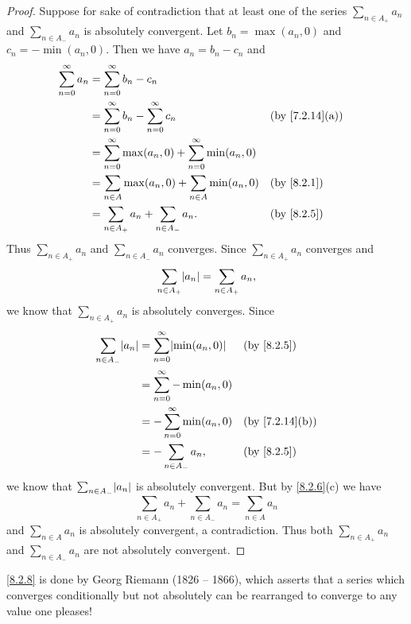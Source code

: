 \begin{proof}
	Suppose for sake of contradiction that at least one of the series \(\sum_{n \in A_+} a_n\) and \(\sum_{n \in A_-} a_n\) is absolutely convergent.
	Let \(b_n = \max(a_n, 0)\) and \(c_n = -\min(a_n, 0)\).
	Then we have \(a_n = b_n - c_n\) and
	\begin{align*}
		\sum_{n = 0}^\infty a_n & = \sum_{n = 0}^\infty b_n - c_n                                                                         \\
		                        & = \sum_{n = 0}^\infty b_n - \sum_{n = 0}^\infty c_n                   &  & \text{(by \cref{7.2.14}(a))} \\
		                        & = \sum_{n = 0}^\infty \max(a_n, 0) + \sum_{n = 0}^\infty \min(a_n, 0)                                   \\
		                        & = \sum_{n \in A} \max(a_n, 0) + \sum_{n \in A} \min(a_n, 0)           &  & \by{8.2.1}                   \\
		                        & = \sum_{n \in A_+} a_n + \sum_{n \in A_-} a_n.                        &  & \by{8.2.5}
	\end{align*}
	Thus \(\sum_{n \in A_+} a_n\) and \(\sum_{n \in A_-} a_n\) converges.
	Since \(\sum_{n \in A_+} a_n\) converges and
	\[
		\sum_{n \in A_+} \abs{a_n} = \sum_{n \in A_+} a_n,
	\]
	we know that \(\sum_{n \in A_+} a_n\) is absolutely converges.
	Since
	\begin{align*}
		\sum_{n \in A_-} \abs{a_n} & = \sum_{n = 0}^\infty \abs{\min(a_n, 0)} &  & \by{8.2.5}                   \\
		                           & = \sum_{n = 0}^\infty -\min(a_n, 0)                                        \\
		                           & = -\sum_{n = 0}^\infty \min(a_n, 0)      &  & \text{(by \cref{7.2.14}(b))} \\
		                           & = -\sum_{n \in A_-} a_n,                 &  & \by{8.2.5}
	\end{align*}
	we know that \(\sum_{n \in A_-} \abs{a_n}\) is absolutely convergent.
	But by \cref{8.2.6}(c) we have
	\[
		\sum_{n \in A_+} a_n + \sum_{n \in A_-} a_n = \sum_{n \in A} a_n
	\]
	and \(\sum_{n \in A} a_n\) is absolutely convergent, a contradiction.
	Thus both \(\sum_{n \in A_+} a_n\) and \(\sum_{n \in A_-} a_n\) are not absolutely convergent.
\end{proof}

\begin{note}
	\cref{8.2.8} is done by Georg Riemann (1826 -- 1866), which asserts that a series which converges conditionally but not absolutely can be rearranged to converge to any value one pleases!
\end{note}

